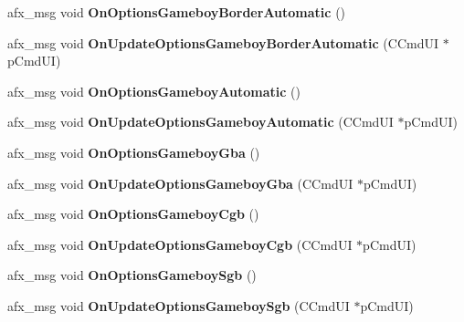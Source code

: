 \begin{DoxyCompactItemize}
\item 
\mbox{\label{class_main_wnd_a3a618010f19c5aa69a036380631eaea7}} 
afx\+\_\+msg void {\bfseries On\+Options\+Gameboy\+Border\+Automatic} ()
\item 
\mbox{\label{class_main_wnd_a7181010c8912d36e6921ef2bfd1adf59}} 
afx\+\_\+msg void {\bfseries On\+Update\+Options\+Gameboy\+Border\+Automatic} (C\+Cmd\+UI $\ast$p\+Cmd\+UI)
\item 
\mbox{\label{class_main_wnd_ab3133ad26d9d8f243c32c3243e8b28d9}} 
afx\+\_\+msg void {\bfseries On\+Options\+Gameboy\+Automatic} ()
\item 
\mbox{\label{class_main_wnd_abb2fc8aa13f0ac3379e8ce8ede02c8ad}} 
afx\+\_\+msg void {\bfseries On\+Update\+Options\+Gameboy\+Automatic} (C\+Cmd\+UI $\ast$p\+Cmd\+UI)
\item 
\mbox{\label{class_main_wnd_abb13c622e7fb92ea067235276584d2ea}} 
afx\+\_\+msg void {\bfseries On\+Options\+Gameboy\+Gba} ()
\item 
\mbox{\label{class_main_wnd_ac19dc2b23a6bc58bd372598025ebf82b}} 
afx\+\_\+msg void {\bfseries On\+Update\+Options\+Gameboy\+Gba} (C\+Cmd\+UI $\ast$p\+Cmd\+UI)
\item 
\mbox{\label{class_main_wnd_a962d2f50647e403aff3939a87cbfbd83}} 
afx\+\_\+msg void {\bfseries On\+Options\+Gameboy\+Cgb} ()
\item 
\mbox{\label{class_main_wnd_a981614dcd952edf9cc56bea10a776116}} 
afx\+\_\+msg void {\bfseries On\+Update\+Options\+Gameboy\+Cgb} (C\+Cmd\+UI $\ast$p\+Cmd\+UI)
\item 
\mbox{\label{class_main_wnd_a8a68d6c4577e01b29a29860266c7ed07}} 
afx\+\_\+msg void {\bfseries On\+Options\+Gameboy\+Sgb} ()
\item 
\mbox{\label{class_main_wnd_a7da1fc10502037d014524bac0bdea7c6}} 
afx\+\_\+msg void {\bfseries On\+Update\+Options\+Gameboy\+Sgb} (C\+Cmd\+UI $\ast$p\+Cmd\+UI)
\item 
\mbox{\label{class_main_wnd_aabb11ee170b5116fb889995f168e6045}} 

\end{DoxyCompactItemize}
